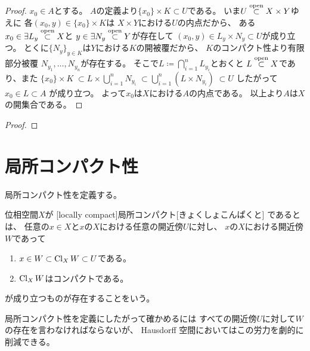 \documentclass[report]{jlreq}
\begin{document}
\begin{proof}
    $x_0 \in A$とする。
    $A$の定義より$\{ x_0 \} \times K \subset U$である。
    いま$U \stackrel{\text{open}}{\subset} X \times Y$ゆえに
    各$(x_0, y) \in \{ x_0 \} \times K$は
    $X \times Y$における$U$の内点だから、
    ある$x_0 \in \exists L_y \stackrel{\text{open}}{\subset} X$と
    $y \in \exists N_y \stackrel{\text{open}}{\subset} Y$が存在して
    $(x_0, y) \in L_y \times N_y \subset U$が成り立つ。
    とくに$\{ N_y \}_{y \in K}$は$Y$における$K$の開被覆だから、
    $K$のコンパクト性より有限部分被覆
    $N_{y_1}, \dots, N_{y_n}$が存在する。
    そこで$L \coloneqq \bigcap_{i=1}^n L_{y_i}$とおくと
    $L \stackrel{\text{open}}{\subset} X$であり、また
    $\{ x_0 \} \times K \;
        \subset L \times \bigcup_{i=1}^n N_{y_i} \;
        \subset \bigcup_{i=1}^n (L \times N_{y_i}) \;
        \subset U$
    したがって
    $x_0 \in L \subset A$
    が成り立つ。
    よって$x_0$は$X$における$A$の内点である。
    以上より$A$は$X$の開集合である。
\end{proof}

\begin{theorem}[Tychonoff]
    \TODO{}
\end{theorem}

\begin{proof}
    \TODO{}
\end{proof}

%
\section{局所コンパクト性}

局所コンパクト性を定義する。

\begin{definition}[局所コンパクト]
    位相空間$X$が
    [locally compact]{局所コンパクト}[きょくしょこんぱくと]
    であるとは、
    任意の$x \in X$と$x$の$X$における任意の開近傍$U$に対し、
    $x$の$X$における開近傍$W$であって
    \begin{enumerate}
        \item $x \in W \subset \operatorname{Cl}_X W \subset U$である。
        \item $\operatorname{Cl}_X W$はコンパクトである。
    \end{enumerate}
    が成り立つものが存在することをいう。
\end{definition}

局所コンパクト性を定義にしたがって確かめるには
すべての開近傍$U$に対して$W$の存在を言わなければならないが、
Hausdorff 空間においてはこの労力を劇的に削減できる。
\end{document}
